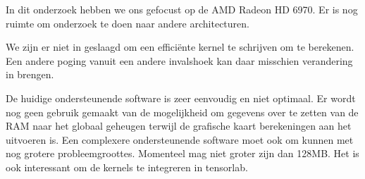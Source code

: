 In dit onderzoek hebben we ons gefocust op de AMD Radeon HD 6970. Er is nog ruimte om onderzoek te doen naar andere architecturen.

We zijn er niet in geslaagd om een effici\"ente kernel te schrijven om \GGG{} te berekenen. Een andere poging vanuit een andere invalshoek kan daar misschien verandering in brengen.

De huidige ondersteunende software is zeer eenvoudig en niet optimaal. Er wordt nog geen gebruik gemaakt van de mogelijkheid om gegevens over te zetten van de RAM naar het globaal geheugen terwijl de grafische kaart berekeningen aan het uitvoeren is. Een complexere ondersteunende software moet ook om kunnen met nog grotere probleemgroottes. Momenteel mag \TT{} niet groter zijn dan 128MB. Het is ook interessant om de kernels te integreren in tensorlab.

